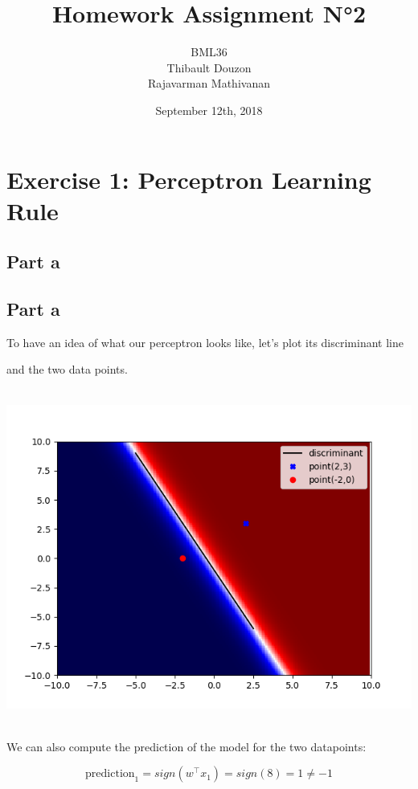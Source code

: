 \documentclass[a4paper, 10pt]{article}
\title{Homework Assignment N°2}
\author{BML36\\Thibault Douzon\\Rajavarman Mathivanan}
\date{September 12th, 2018}
\begin{document}
\maketitle

\pagebreak

\tableofcontents
\pagebreak
\section{Exercise 1: Perceptron Learning Rule}
\subsection{Part a}

\subsection{Part a} 

To have an idea of what our perceptron looks like, let's plot its discriminant line 

and the two data points. 

\\ 

\includegraphics[scale=0.6]{ex1_a.png} 

\\ 

We can also compute the prediction of the model for the two datapoints: 

$$ 

\text{prediction}_1 = sign(w^\top x_1) = sign(8) = 1 \ne -1 

$$ 
\end{document}
